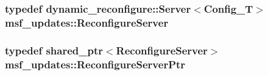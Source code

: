 \hypertarget{namespacemsf__updates_a84e4237e24ccbd1cd9b9211f39e40a67}{
\subsubsection[{Reconfigure\-Server}]{\setlength{\rightskip}{0pt plus 5cm}typedef dynamic\-\_\-reconfigure\-::\-Server$<${\bf Config\-\_\-\-T}$>$ {\bf msf\-\_\-updates\-::\-Reconfigure\-Server}}}\label{namespacemsf__updates_a84e4237e24ccbd1cd9b9211f39e40a67}
\hypertarget{namespacemsf__updates_a727af77e9a65a5389c5971fde09a7377}{
\subsubsection[{Reconfigure\-Server\-Ptr}]{\setlength{\rightskip}{0pt plus 5cm}typedef shared\-\_\-ptr$<${\bf Reconfigure\-Server}$>$ {\bf msf\-\_\-updates\-::\-Reconfigure\-Server\-Ptr}}}\label{namespacemsf__updates_a727af77e9a65a5389c5971fde09a7377}


